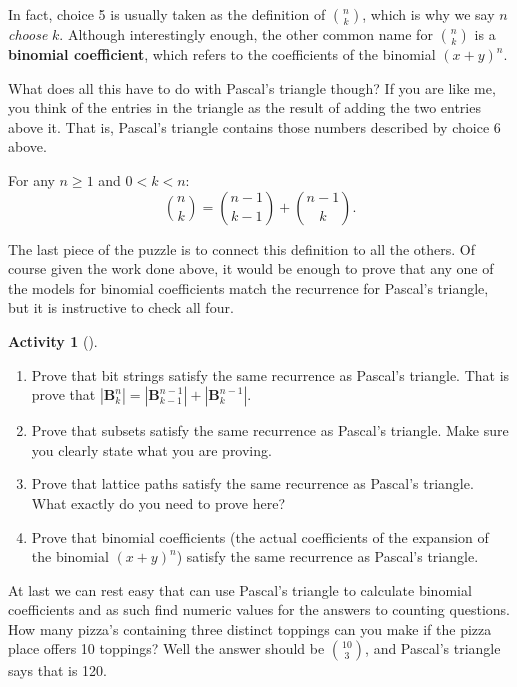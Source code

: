 \documentclass[10pt,]{book}
\newcommand{\terminology}[1]{\textbf{#1}}
\theoremstyle{plain}
\theoremstyle{definition}
\theoremstyle{definition}
\theoremstyle{definition}
\newtheorem{activity}[project]{Activity}
\numberwithin{equation}{chapter}
\def\B{\mathbf{B}}
\newcommand{\lt}{<}
\begin{document}
%
\par
\hypertarget{p-534}{}%
In fact, choice 5 is usually taken as the definition of \(\binom{n}{k}\), which is why we say \(n\) \emph{choose} \(k\).  Although interestingly enough, the other common name for \(\binom{n}{k}\) is a \terminology{binomial coefficient}, which refers to the coefficients of the binomial \((x+y)^n\).%
\par
\hypertarget{p-535}{}%
What does all this have to do with Pascal's triangle though?  If you are like me, you think of the entries in the triangle as the result of adding the two entries above it.  That is, Pascal's triangle contains those numbers described by choice 6 above.%
\begin{assemblage}\label{assemblage-2}
\hypertarget{p-536}{}%
For any \(n \ge 1\) and \(0 \lt k \lt n\):%
\begin{equation*}
{n \choose k} = {n-1 \choose k-1} + {n-1 \choose k}.
\end{equation*}
%
\end{assemblage}
\hypertarget{p-537}{}%
The last piece of the puzzle is to connect this definition to all the others.  Of course given the work done above, it would be enough to prove that any one of the models for binomial coefficients match the recurrence for Pascal's triangle, but it is instructive to check all four.%
\begin{activity}[]\label{activity-64}
\leavevmode%
\begin{enumerate}[font=\bfseries,label=(\alph*),ref=\alph*]
\item\label{task-98} \hypertarget{p-538}{}%
Prove that bit strings satisfy the same recurrence as Pascal's triangle.  That is prove that \(|\B^n_k| = |\B^{n-1}_{k-1}| + |\B^{n-1}_k|\).%
\item\label{task-99} \hypertarget{p-539}{}%
Prove that subsets satisfy the same recurrence as Pascal's triangle. Make sure you clearly state what you are proving.%
\item\label{task-100} \hypertarget{p-540}{}%
Prove that lattice paths satisfy the same recurrence as Pascal's triangle.  What exactly do you need to prove here?%
\item\label{task-101} \hypertarget{p-541}{}%
Prove that binomial coefficients (the actual coefficients of the expansion of the binomial \((x+y)^n\)) satisfy the same recurrence as Pascal's triangle.%
\end{enumerate}
\end{activity}
\hypertarget{p-542}{}%
At last we can rest easy that can use Pascal's triangle to calculate binomial coefficients and as such find numeric values for the answers to counting questions. How many pizza's containing three distinct toppings can you make if the pizza place offers 10 toppings?  Well the answer should be \(\binom{10}{3}\), and Pascal's triangle says that is 120.%
\typeout{************************************************}
\typeout{************************************************}
\end{document}
